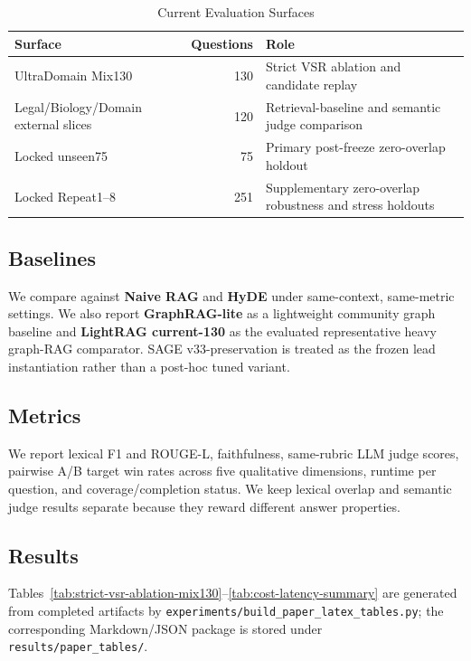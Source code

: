 \documentclass[journal,onecolumn,11pt]{IEEEtran}
\begin{document}
\begin{table}[htbp]
\caption{Current Evaluation Surfaces}
\label{tab:datasets}
\centering
\begin{tabular}{lrl}
\toprule
Surface & Questions & Role \\
\midrule
UltraDomain Mix130 & 130 & Strict VSR ablation and candidate replay \\
Legal/Biology/Domain external slices & 120 & Retrieval-baseline and semantic judge comparison \\
Locked unseen75 & 75 & Primary post-freeze zero-overlap holdout \\
Locked Repeat1--8 & 251 & Supplementary zero-overlap robustness and stress holdouts \\
\bottomrule
\end{tabular}
\end{table}

\subsection{Baselines}

We compare against \textbf{Naive RAG} and \textbf{HyDE} under same-context, same-metric settings. We also report \textbf{GraphRAG-lite} as a lightweight community graph baseline and \textbf{LightRAG current-130} as the evaluated representative heavy graph-RAG comparator. SAGE v33-preservation is treated as the frozen lead instantiation rather than a post-hoc tuned variant.

\subsection{Metrics}

We report lexical F1 and ROUGE-L, faithfulness, same-rubric LLM judge scores, pairwise A/B target win rates across five qualitative dimensions, runtime per question, and coverage/completion status. We keep lexical overlap and semantic judge results separate because they reward different answer properties.

\subsection{Results}

Tables~\ref{tab:strict-vsr-ablation-mix130}--\ref{tab:cost-latency-summary} are generated from completed artifacts by \texttt{experiments/build\_paper\_latex\_tables.py}; the corresponding Markdown/JSON package is stored under \texttt{results/paper\_tables/}.
\end{document}
